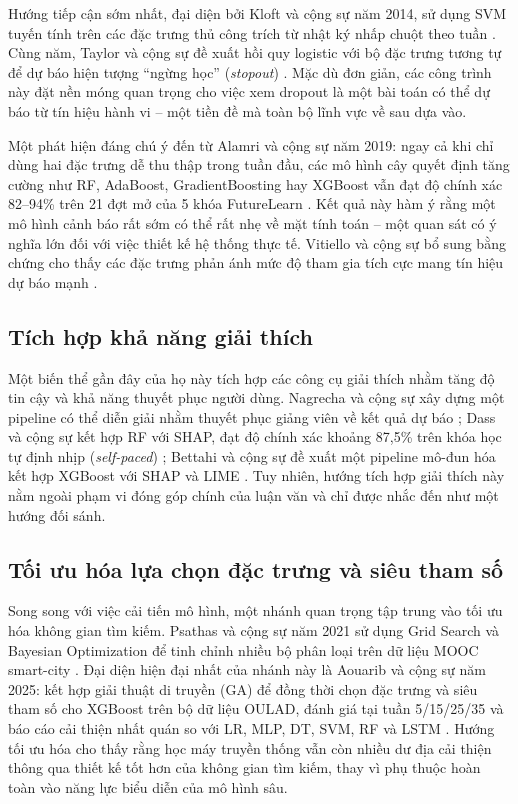 Hướng tiếp cận sớm nhất, đại diện bởi Kloft và cộng sự năm 2014, sử dụng SVM tuyến tính trên các đặc trưng thủ công trích từ nhật ký nhấp chuột theo tuần \cite{Kloft2014}. Cùng năm, Taylor và cộng sự đề xuất hồi quy logistic với bộ đặc trưng tương tự để dự báo hiện tượng ``ngừng học'' (\textit{stopout}) \cite{Taylor2014}. Mặc dù đơn giản, các công trình này đặt nền móng quan trọng cho việc xem dropout là một bài toán có thể dự báo từ tín hiệu hành vi -- một tiền đề mà toàn bộ lĩnh vực về sau dựa vào.

Một phát hiện đáng chú ý đến từ Alamri và cộng sự năm 2019: ngay cả khi chỉ dùng hai đặc trưng dễ thu thập trong tuần đầu, các mô hình cây quyết định tăng cường như RF, AdaBoost, GradientBoosting hay XGBoost vẫn đạt độ chính xác 82--94\% trên 21 đợt mở của 5 khóa FutureLearn \cite{Alamri2019}. Kết quả này hàm ý rằng một mô hình cảnh báo rất sớm có thể rất nhẹ về mặt tính toán -- một quan sát có ý nghĩa lớn đối với việc thiết kế hệ thống thực tế. Vitiello và cộng sự bổ sung bằng chứng cho thấy các đặc trưng phản ánh mức độ tham gia tích cực mang tín hiệu dự báo mạnh \cite{Vitiello2018}.

\subsection{Tích hợp khả năng giải thích}

Một biến thể gần đây của họ này tích hợp các công cụ giải thích nhằm tăng độ tin cậy và khả năng thuyết phục người dùng. Nagrecha và cộng sự xây dựng một pipeline có thể diễn giải nhằm thuyết phục giảng viên về kết quả dự báo \cite{Nagrecha2017}; Dass và cộng sự kết hợp RF với SHAP, đạt độ chính xác khoảng 87,5\% trên khóa học tự định nhịp (\textit{self-paced}) \cite{Dass2021}; Bettahi và cộng sự đề xuất một pipeline mô-đun hóa kết hợp XGBoost với SHAP và LIME \cite{Bettahi2025}. Tuy nhiên, hướng tích hợp giải thích này nằm ngoài phạm vi đóng góp chính của luận văn và chỉ được nhắc đến như một hướng đối sánh.

\subsection{Tối ưu hóa lựa chọn đặc trưng và siêu tham số}

Song song với việc cải tiến mô hình, một nhánh quan trọng tập trung vào tối ưu hóa không gian tìm kiếm. Psathas và cộng sự năm 2021 sử dụng Grid Search và Bayesian Optimization để tinh chỉnh nhiều bộ phân loại trên dữ liệu MOOC smart-city \cite{Psathas2021}. Đại diện hiện đại nhất của nhánh này là Aouarib và cộng sự năm 2025: kết hợp giải thuật di truyền (GA) để đồng thời chọn đặc trưng và siêu tham số cho XGBoost trên bộ dữ liệu OULAD, đánh giá tại tuần 5/15/25/35 và báo cáo cải thiện nhất quán so với LR, MLP, DT, SVM, RF và LSTM \cite{Aouarib2025}. Hướng tối ưu hóa cho thấy rằng học máy truyền thống vẫn còn nhiều dư địa cải thiện thông qua thiết kế tốt hơn của không gian tìm kiếm, thay vì phụ thuộc hoàn toàn vào năng lực biểu diễn của mô hình sâu.

